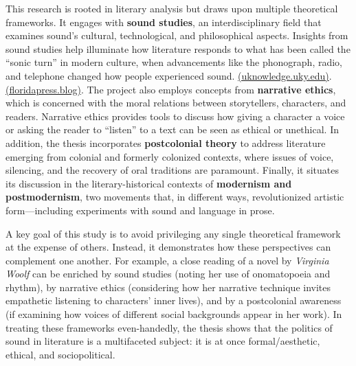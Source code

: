 \documentclass[12pt]{report}
\begin{document}
This research is rooted in literary analysis but draws upon multiple theoretical frameworks. It engages with \textbf{sound studies}, an interdisciplinary field that examines sound’s cultural, technological, and philosophical aspects. Insights from sound studies help illuminate how literature responds to what has been called the “sonic turn” in modern culture, when advancements like the phonograph, radio, and telephone changed how people experienced sound. \href{https://uknowledge.uky.edu/english_etds/29/#:~:text=acts%20of%20listening%20in%20modern,perceiving%20self%20in%20increasingly%20urban}{(uknowledge.uky.edu)}. \href{https://floridapress.blog/2018/12/04/modernist-soundscapes/#:~:text=She%20argues%20that%20the%20common,reproduction%20of%20the%20tape%20recorder}{(floridapress.blog)}. The project also employs concepts from \textbf{narrative ethics}, which is concerned with the moral relations between storytellers, characters, and readers. Narrative ethics provides tools to discuss how giving a character a voice or asking the reader to “listen” to a text can be seen as ethical or unethical. In addition, the thesis incorporates \textbf{postcolonial theory} to address literature emerging from colonial and formerly colonized contexts, where issues of voice, silencing, and the recovery of oral traditions are paramount. Finally, it situates its discussion in the literary-historical contexts of \textbf{modernism and postmodernism}, two movements that, in different ways, revolutionized artistic form—including experiments with sound and language in prose.

A key goal of this study is to avoid privileging any single theoretical framework at the expense of others. Instead, it demonstrates how these perspectives can complement one another. For example, a close reading of a novel by \textit{Virginia Woolf} can be enriched by sound studies (noting her use of onomatopoeia and rhythm), by narrative ethics (considering how her narrative technique invites empathetic listening to characters’ inner lives), and by a postcolonial awareness (if examining how voices of different social backgrounds appear in her work). In treating these frameworks even-handedly, the thesis shows that the politics of sound in literature is a multifaceted subject: it is at once formal/aesthetic, ethical, and sociopolitical.
\end{document}
